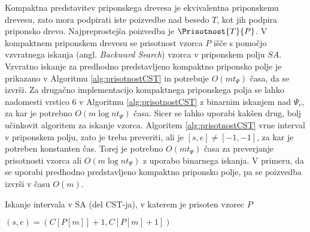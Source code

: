 Kompaktna predstavitev priponskega drevesa je ekvivalentna priponskemu drevesu, zato mora podpirati iste poizvedbe nad besedo $T$, kot jih podpira priponsko drevo. Najpreprostejša poizvedba je $\Prisotnost{T}{P}$. V kompaktnem priponskem drevesu se prisotnost vzorca $P$ išče s pomočjo vzvratnega iskanja (angl. \textit{Backward Search}) vzorca v priponskem polju $SA$. Vzvratno iskanje za predhodno predstavljeno kompaktno priponsko polje je prikazano v Algoritmu \ref{alg:prisotnostCST} in potrebuje $O(mt_\Psi)$ časa, da se izvrši. Za drugačno implementacijo kompaktnega priponskega polja se lahko nadomesti vrstico 6 v Algoritmu \ref{alg:prisotnostCST} z binarnim iskanjem nad $\Psi_c$, za kar je potrebno $O(m\log{n}t_\Psi)$ časa. Sicer se lahko uporabi kakšen drug, bolj učinkovit algoritem za iskanje vzorca. Algoritem \ref{alg:prisotnostCST} vrne interval v priponskem polju, zato je treba preveriti, ali je $[s,e]\ne[-1,-1]$, za kar je potreben konstanten čas. Torej je potrebno $O(mt_\Psi)$ časa za preverjanje prisotnosti vzorca ali $O(m\log{n}t_\Psi)$ z uporabo binarnega iskanja. V primeru, da se uporabi predhodno predstavljeno kompaktno priponsko polje, pa se poizvedba izvrši v času $O(m)$. 

\begin{algorithm}[tb]

\caption{Iskanje intervala v SA (del CST-ja), v katerem je prisoten vzorec $P$ \cite{Navarro2016}}\label{alg:prisotnostCST}    
{
    {$(s,e)=(C[P[m]]+1,C[P[m]+1])$}
    


    {\KwRet{$[s,e]$}}
}

\end{algorithm}

